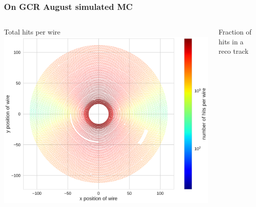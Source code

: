 \documentclass[18pt]{beamer}
\begin{document}
\begin{frame}
  \frametitle{On GCR August simulated MC}
  \begin{columns}
    \begin{column}{0.5\textwidth}
      \centering
      Total hits per wire
      \includegraphics[width=1.\textwidth]{figures/hit_efficiency_by_wire/total_hits_per_wire_MC.pdf}
    \end{column}
    \begin{column}{0.5\textwidth}
      \centering
      Fraction of hits in a reco track

\end{column}
\end{columns}
\end{frame}
\end{document}
